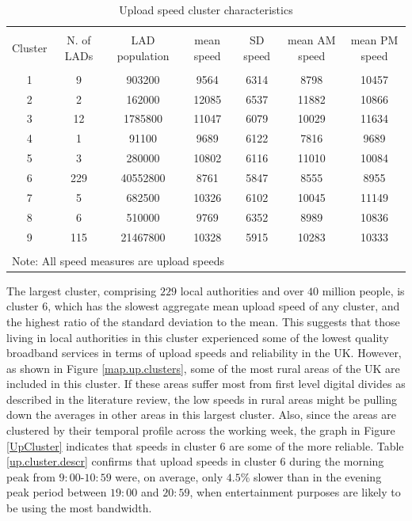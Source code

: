\documentclass[]{interact}
\theoremstyle{plain}%
\theoremstyle{definition}
\theoremstyle{remark}
\begin{document}
\begin{table}[!htbp] \centering 
  \caption{Upload speed cluster characteristics\label{up.cluster.descr}} 
  \label{} 
\footnotesize 
\begin{tabular}{@{\extracolsep{0pt}} ccccccc} 
\\[-1.8ex]\hline 
\hline \\[-1.8ex] 
Cluster & N. of LADs & LAD population & mean speed & SD speed & mean AM speed & mean PM speed \\ 
\hline \\[-1.8ex] 
1 & 9 & 903200 & 9564 & 6314 & 8798 & 10457 \\ 
2 & 2 & 162000 & 12085 & 6537 & 11882 & 10866 \\ 
3 & 12 & 1785800 & 11047 & 6079 & 10029 & 11634 \\ 
4 & 1 & 91100 & 9689 & 6122 & 7816 & 9689 \\ 
5 & 3 & 280000 & 10802 & 6116 & 11010 & 10084 \\ 
6 & 229 & 40552800 & 8761 & 5847 & 8555 & 8955 \\ 
7 & 5 & 682500 & 10326 & 6102 & 10045 & 11149 \\ 
8 & 6 & 510000 & 9769 & 6352 & 8989 & 10836 \\ 
9 & 115 & 21467800 & 10328 & 5915 & 10283 & 10333 \\ 
\hline \\[-1.8ex] 
\multicolumn{7}{l}{Note: All speed measures are upload speeds} \\ 
\end{tabular} 
\end{table}

The largest cluster, comprising \(229\) local authorities and over
\(40\) million people, is cluster \(6\), which has the slowest aggregate
mean upload speed of any cluster, and the highest ratio of the standard
deviation to the mean. This suggests that those living in local
authorities in this cluster experienced some of the lowest quality
broadband services in terms of upload speeds and reliability in the UK.
However, as shown in Figure \ref{map.up.clusters}, some of the most
rural areas of the UK are included in this cluster. If these areas
suffer most from first level digital divides as described in the
literature review, the low speeds in rural areas might be pulling down
the averages in other areas in this largest cluster. Also, since the
areas are clustered by their temporal profile across the working week,
the graph in Figure \ref{UpCluster} indicates that speeds in cluster
\(6\) are some of the more reliable. Table \ref{up.cluster.descr}
confirms that upload speeds in cluster \(6\) during the morning peak
from \(9:00\)-\(10:59\) were, on average, only \(4.5\)\% slower than in
the evening peak period between \(19:00\) and \(20:59\), when
entertainment purposes are likely to be using the most bandwidth.
\end{document}
